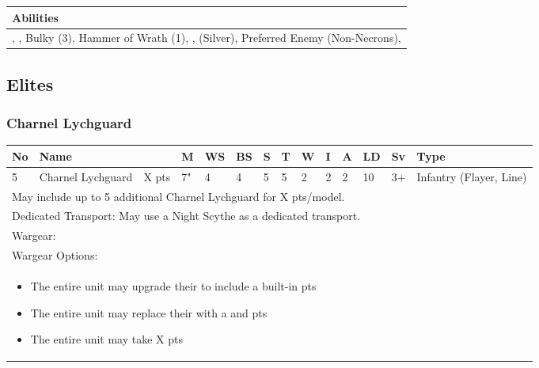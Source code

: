 \noindent
\begin{tabular}{||m{532pt}||}
	\hline
	Abilities \\
	\hline
	\quickref{Annihilation Protocols}, \quickref{Command Protocols}, Bulky (3), Hammer of Wrath (1), \quickref{Living Metal}, \quickref{Nodal Command} (Silver), Preferred Enemy (Non-Necrons), \quickref{Reanimation Protocols} \\
	\hline
\end{tabular}


\newpage
\subsection{Elites}

\subsubsection{Charnel Lychguard}

\noindent
\begin{tabular}{||m{10pt} m{95pt} m{30pt} m{11pt} m{11pt} m{11pt} m{11pt} m{11pt} m{11pt} m{11pt} m{11pt} m{11pt} m{11pt} m{125pt}||}
	\hline
	No & Name & & M & WS & BS & S & T & W & I & A & LD & Sv & Type \\
	\hline
	5 & Charnel Lychguard & X pts & 7" & 4 & 4 & 5 & 5 & 2 & 2 & 2 & 10 & 3+ & Infantry (Flayer, Line)\\
	\hline
	\hline
	\multicolumn{14}{||Z{532 pt}||}{May include up to 5 additional Charnel Lychguard for X pts/model.}\\	
	\multicolumn{14}{||Z{532 pt}||}{Dedicated Transport: May use a Night Scythe as a dedicated transport.}\\	
	\hline
	\hline
	\multicolumn{14}{||Z{532 pt}||}{Wargear: \quickref{Warscythe}}\\
	\multicolumn{14}{||Z{532 pt}||}{Wargear Options:} \\
	\multicolumn{14}{||Z{532 pt}||}{\begin{itemize}
			\item The entire unit may upgrade their \quickref{Warscythe} to include a built-in \quickref{Gauss Blaster} \hrulefill 5 pts
			\item The entire unit may replace their \quickref{Warscythe} with a \quickref{Hyperphase Sword} and \quickref{Dispersion Shield} \hrulefill 10 pts
			\item The entire unit may take \quickref{Flensing Scarabs} \hrulefill X pts
	\end{itemize}} \\
	\hline
\end{tabular}

